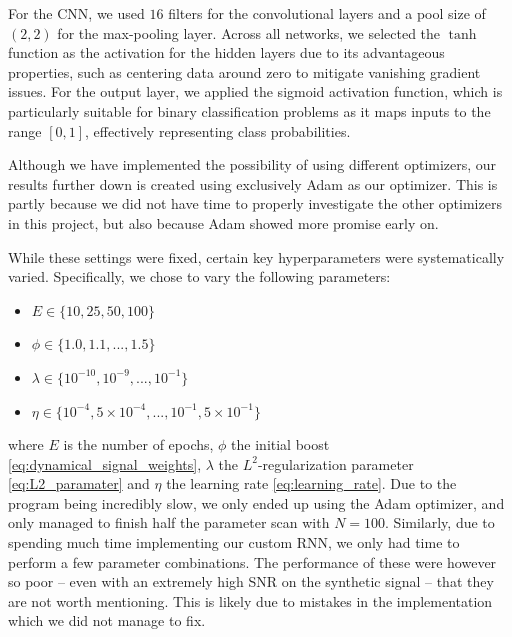 \documentclass[%
reprint,
amsmath,amssymb,
aps,
]{revtex4-2}
\begin{document}
For the CNN, we used \(16\) filters for the convolutional layers and a pool size of \((2,2)\) for the max-pooling layer. Across all networks, we selected the \(\tanh\) function as the activation for the hidden layers due to its advantageous properties, such as centering data around zero to mitigate vanishing gradient issues. For the output layer, we applied the sigmoid activation function, which is particularly suitable for binary classification problems as it maps inputs to the range \([0,1]\), effectively representing class probabilities.

Although we have implemented the possibility of using different optimizers, our results further down is created using exclusively Adam as our optimizer. This is partly because we did not have time to properly investigate the other optimizers in this project, but also because Adam showed more promise early on. 

While these settings were fixed, certain key hyperparameters were systematically varied. Specifically, we chose to vary the following parameters:
\begin{itemize}
	\item $E\in\{10,25,50,100\}$
	\item $\phi\in\{1.0,1.1,...,1.5\}$
	\item $\lambda\in\{10^{-10},10^{-9},...,10^{-1}\}$
	\item $\eta\in\{10^{-4},5\times10^{-4},...,10^{-1},5\times10^{-1}\}$
\end{itemize}
where $E$ is the number of epochs, \(\phi\) the initial boost \eqref{eq:dynamical_signal_weights}, \(\lambda\) the \(L^2\)-regularization parameter \eqref{eq:L2_paramater} and \(\eta\) the learning rate \eqref{eq:learning_rate}. Due to the program being incredibly slow, we only ended up using the Adam optimizer, and only managed to finish half the parameter scan with $N=100$. Similarly, due to spending much time implementing our custom RNN, we only had time to perform a few parameter combinations. The performance of these were however so poor -- even with an extremely high SNR on the synthetic signal -- that they are not worth mentioning. This is likely due to mistakes in the implementation which we did not manage to fix.
\end{document}
